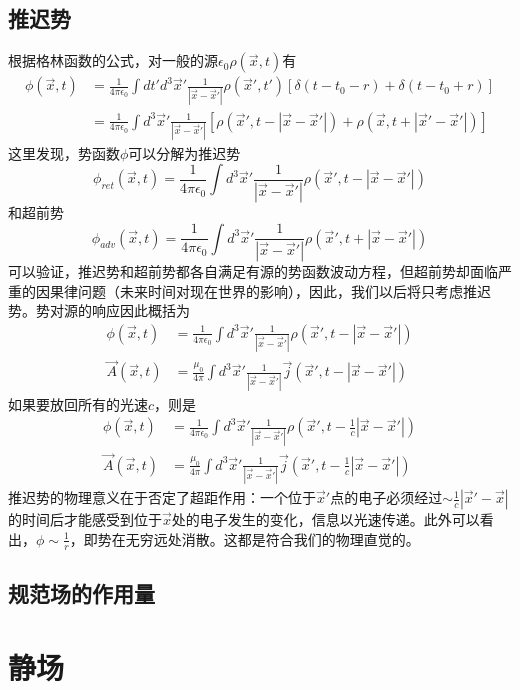 \documentclass[a4paper,11pt]{ctexart}
\newcommand{\beq}{\begin{equation}}
\newcommand{\eeq}{\end{equation}}
\newcommand{\bea}{\begin{equation}\begin{aligned}}
\newcommand{\eea}{\end{aligned}\end{equation}}
\newcommand{\epv}{\epsilon_0}
\begin{document}
\subsection{推迟势}
根据格林函数的公式，对一般的源$\epv \rho(\vec{x},t)$有
\bea
\phi(\vec{x},t) &=\frac{1}{4\pi \epv}  \int dt'd^3 \vec{x}' \frac{1}{|\vec{x}-\vec{x}'|} \rho(\vec{x}',t') \left[\delta (t-t_0-r) + \delta (t-t_0+r) \right]\\
&= \frac{1}{4\pi \epv} \int d^3 \vec{x}' \frac{1}{|\vec{x}-\vec{x}'|} \left[\rho(\vec{x}',t-|\vec{x}-\vec{x}'|) + \rho(\vec{x},t+|\vec{x}'-\vec{x}'|) \right]
\eea
这里发现，势函数$\phi$可以分解为推迟势
\beq
\phi_{ret} (\vec{x},t) = \frac{1}{4\pi \epv} \int d^3 \vec{x}' \frac{1}{|\vec{x}-\vec{x}'|} \rho(\vec{x}',t-|\vec{x}-\vec{x}'|) 
\eeq
和超前势
\beq
\phi_{adv} (\vec{x},t) = \frac{1}{4\pi \epv} \int d^3 \vec{x}' \frac{1}{|\vec{x}-\vec{x}'|} \rho(\vec{x}',t+|\vec{x}-\vec{x}'| )
\eeq
可以验证，推迟势和超前势都各自满足有源的势函数波动方程，但超前势却面临严重的因果律问题（未来时间对现在世界的影响），因此，我们以后将只考虑推迟势。势对源的响应因此概括为
\bea \label{retp}
\phi(\vec x,t) &= \frac{1}{4\pi \epv} \int d^3 \vec{x}' \frac{1}{|\vec{x}-\vec{x}'|} \rho(\vec{x}',t-|\vec{x}-\vec{x}'|)  \\
\vec A (\vec x,t) &= \frac{\mu_0 }{4\pi } \int d^3 \vec{x}' \frac{1}{|\vec{x}-\vec{x}'|} \vec j (\vec{x}',t-|\vec{x}-\vec{x}'|) 
\eea
如果要放回所有的光速$c$，则是
\bea
\phi(\vec x,t) &= \frac{1}{4\pi \epv} \int d^3 \vec{x}' \frac{1}{|\vec{x}-\vec{x}'|} \rho(\vec{x}',t-\frac{1}{c}|\vec{x}-\vec{x}'|)  \\
\vec A (\vec x,t) &= \frac{\mu_0 }{4\pi } \int d^3 \vec{x}' \frac{1}{|\vec{x}-\vec{x}'|} \vec j (\vec{x}',t-\frac{1}{c}|\vec{x}-\vec{x}'|) 
\eea
推迟势的物理意义在于否定了超距作用：一个位于$\vec{x}'$点的电子必须经过$\sim \frac{1}{c} \left| \vec{x}' - \vec{x} \right|$的时间后才能感受到位于$\vec{x}$处的电子发生的变化，信息以光速传递。此外可以看出，$\phi \sim \frac{1}{r}$，即势在无穷远处消散。这都是符合我们的物理直觉的。
\subsection{规范场的作用量}

\section{静场}
\end{document}
